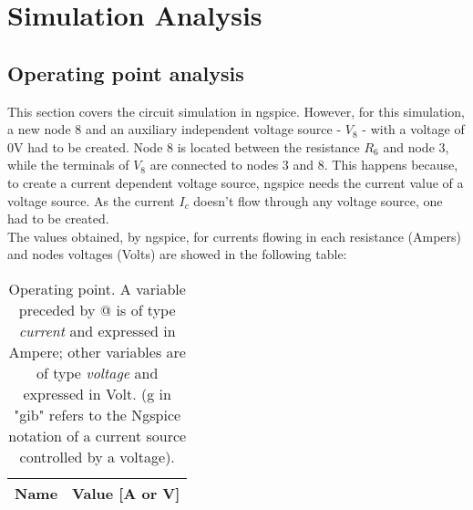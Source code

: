 \newpage
\section{Simulation Analysis}
\label{sec:simulation}

\subsection{Operating point analysis}
This section covers the circuit simulation in ngspice. However, for this simulation, 
a new node 8 and an auxiliary independent voltage source - $V_8$ - with a voltage of 0V had to be created. 
Node 8 is located between the resistance $R_6$ and node 3, while the terminals of $V_8$ are connected to nodes 3 and 8. 
This happens because, to create a current dependent voltage source, ngspice needs the current value of a voltage source. 
As the current $I_c$ doesn't flow through any voltage source, one had to be created. \\
\noindent
The values obtained, by ngspice, for currents flowing in each resistance (Ampers) and nodes voltages (Volts) are showed in the following table:
\begin{table}[h!]
  \centering
  \begin{tabular}{|c|c|}
    \hline    
    {\bf Name} & {\bf Value [A or V]} \\ \hline
    
  \end{tabular}
  \caption{Operating point. A variable preceded by @ is of type {\em current}
    and expressed in Ampere; other variables are of type {\it voltage} and expressed in
    Volt. (g in "gib" refers to the Ngspice notation of a current source controlled by a voltage).}
  \label{tab:op}
\end{table}





